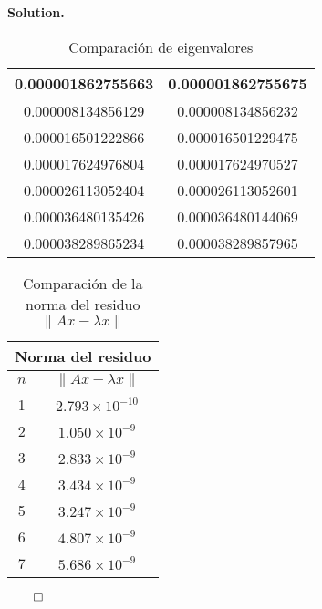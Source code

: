 \documentclass{article}
\theoremstyle{problemstyle}
\newenvironment{solution}{%
  \begin{mdframed}[linewidth=0.8pt,linecolor=Gray,backgroundcolor=Gray!5,roundcorner=5pt]%
  \noindent\textbf{Solution.}%
}{%
\hfill $ \qed $ 
  \end{mdframed}%
}
\begin{document}
\begin{solution}
\begin{enumerate}
\begin{table}[H]
\begin{center}
\begin{tabular}{|c|c|}
					      0.000001862755663 & 0.000001862755675 \\
					      \hline
					      0.000008134856129 & 0.000008134856232 \\
					      \hline
					      0.000016501222866 & 0.000016501229475 \\
					      \hline
					      0.000017624976804 & 0.000017624970527 \\
					      \hline
					      0.000026113052404 & 0.000026113052601 \\
					      \hline
					      0.000036480135426 & 0.000036480144069 \\
					      \hline
					      0.000038289865234 & 0.000038289857965 \\
					      \hline
				      \end{tabular}
			      \end{center}
			      \caption{Comparaci\'on de eigenvalores}\label{tab:evals_comparison_small}
		      \end{table}
		      \begin{table}[H]
			      \begin{center}
				      \begin{tabular}{|c|c|}
					      \multicolumn{2}{c}{Norma del residuo} \\
					      \hline
					      $n$ & $\lVert Ax - \lambda x \rVert$  \\
					      \hline
					      1   & $2.793 \times 10^{-10}$         \\
					      \hline
					      2   & $1.050 \times 10^{-9}$          \\
					      \hline
					      3   & $2.833 \times 10^{-9}$          \\
					      \hline
					      4   & $3.434 \times 10^{-9}$          \\
					      \hline
					      5   & $3.247 \times 10^{-9}$          \\
					      \hline
					      6   & $4.807 \times 10^{-9}$          \\
					      \hline
					      7   & $5.686 \times 10^{-9}$          \\
					      \hline
				      \end{tabular}
			      \end{center}
			      \caption{Comparaci\'on de la norma del residuo $\lVert Ax - \lambda x \rVert$}\label{tab:residual_norms_small}
		      \end{table}

	\end{enumerate}

\end{solution}
\end{document}
